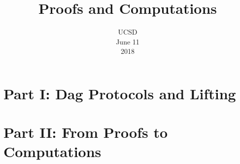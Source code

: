 \documentclass[english, xcolor = {table}]{beamer}
\title[Proofs and Computations]{
	Proofs and Computations
}
\author[Sokolov D.]{
	\texorpdfstring{
		\begin{columns}
    		\column{0.45\linewidth}
            \centering
            \rbox{
                Ankit Garg\\
                Microsoft Research
            }
            \column{0.45\linewidth}
            \centering
            \rbox{
                Mika G{\"{o}}{\"{o}}s\\
                Harvard University
            }
        \end{columns}
        \vspace{0.5cm}
        \begin{columns}
            \column{0.45\linewidth}
            \centering
            \rbox{
                Pritish Kamath\\
                MIT
            }
            \column{0.45\linewidth}
            \centering
            \rbox{
       	        Dmitry Sokolov\\
            	KTH University
            }
        \end{columns}
    }{
        temp
    }
}
\date{UCSD\\
	June 11\\
	2018
}
\begin{document}
    \maketitle

    \section{Part I: Dag Protocols and Lifting}

    
    
    
    

    \section{Part II: From Proofs to Computations}

    
    
    
\end{document}

